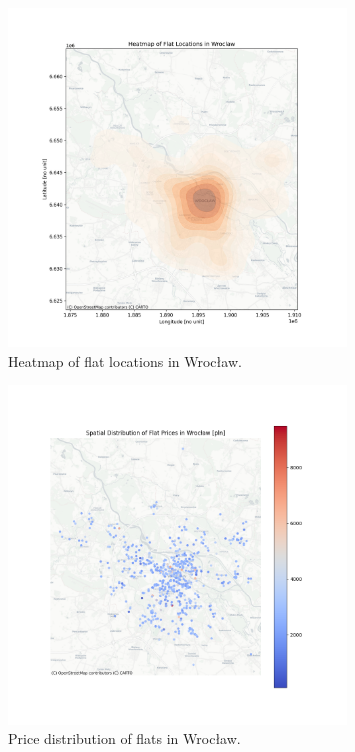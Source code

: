     \begin{figure}[H]
        \centering
        \includegraphics[width=0.8\textwidth]{figures/wroclaw_heatmap.png}
        \caption{Heatmap of flat locations in Wrocław.}
        \label{fig:wroclaw_heatmap}
    \end{figure}

    \begin{figure}[H]
        \centering
        \includegraphics[width=0.8\textwidth]{figures/wroclaw_price_distribution.png}
        \caption{Price distribution of flats in Wrocław.}
        \label{fig:wroclaw_price_distribution}
    \end{figure}